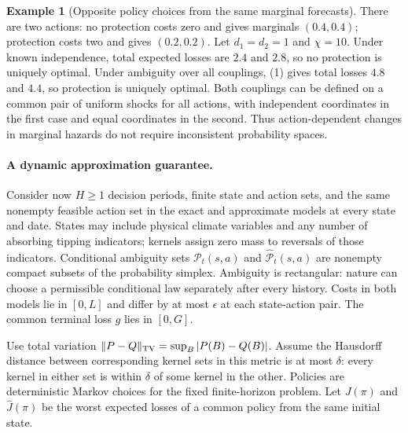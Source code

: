 \documentclass[11pt]{article}
\theoremstyle{definition}
\newtheorem{example}[theorem]{Example}
\begin{document}
\begin{example}[Opposite policy choices from the same marginal forecasts]
There are two actions: no protection costs zero and gives marginals $(0.4,0.4)$; protection costs two and gives $(0.2,0.2)$. Let $d_1=d_2=1$ and $\chi=10$. Under known independence, total expected losses are $2.4$ and $2.8$, so no protection is uniquely optimal. Under ambiguity over all couplings, (1) gives total losses $4.8$ and $4.4$, so protection is uniquely optimal. Both couplings can be defined on a common pair of uniform shocks for all actions, with independent coordinates in the first case and equal coordinates in the second. Thus action-dependent changes in marginal hazards do not require inconsistent probability spaces.
\end{example}

\paragraph{A dynamic approximation guarantee.}
Consider now $H\geq1$ decision periods, finite state and action sets, and the same nonempty feasible action set in the exact and approximate models at every state and date. States may include physical climate variables and any number of absorbing tipping indicators; kernels assign zero mass to reversals of those indicators. Conditional ambiguity sets $\mathcal P_t(s,a)$ and $\widehat{\mathcal P}_t(s,a)$ are nonempty compact subsets of the probability simplex. Ambiguity is rectangular: nature can choose a permissible conditional law separately after every history. Costs in both models lie in $[0,L]$ and differ by at most $\epsilon$ at each state-action pair. The common terminal loss $g$ lies in $[0,G]$.

Use total variation $\|P-Q\|_{\rm TV}=\sup_B|P(B)-Q(B)|$. Assume the Hausdorff distance between corresponding kernel sets in this metric is at most $\delta$: every kernel in either set is within $\delta$ of some kernel in the other. Policies are deterministic Markov choices for the fixed finite-horizon problem. Let $J(\pi)$ and $\widehat J(\pi)$ be the worst expected losses of a common policy from the same initial state.
\end{document}

